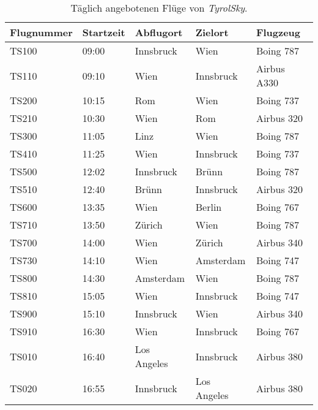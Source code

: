 \begin{table}
  \centering
  \begin{tabular}{lllll}
  Flugnummer & Startzeit & Abflugort     & Zielort    & Flugzeug    \\ \hline  %
    TS100  & 09:00   & Innsbruck     & Wien     & Boing 787   \\      %
    TS110  & 09:10   & Wien       & Innsbruck   & Airbus A330  \\      %
    TS200  & 10:15   & Rom        & Wien     & Boing 737   \\      %
    TS210  & 10:30   & Wien     	& Rom      & Airbus 320   \\      %
    TS300  & 11:05   & Linz       & Wien     & Boing 787   \\      %
    TS410  & 11:25   & Wien       & Innsbruck   & Boing 737   \\      %
    TS500  & 12:02   & Innsbruck     & Brünn     & Boing 787   \\      %
    TS510  & 12:40   & Brünn       & Innsbruck   & Airbus 320   \\      %
    TS600  & 13:35   & Wien       & Berlin    & Boing 767   \\      %
    TS710  & 13:50   & Zürich      & Wien     & Boing 787   \\      %
    TS700  & 14:00   & Wien       & Zürich    & Airbus 340   \\      %
    TS730  & 14:10   & Wien       & Amsterdam   & Boing 747   \\      %
    TS800  & 14:30   & Amsterdam     & Wien     & Boing 787   \\      %
    TS810  & 15:05   & Wien       & Innsbruck   & Boing 747   \\      %
    TS900  & 15:10   & Innsbruck     & Wien     & Airbus 340   \\      %
    TS910  & 16:30   & Wien       & Innsbruck   & Boing 767   \\      %
    TS010  & 16:40   & Los Angeles    & Innsbruck   & Airbus 380   \\      %
    TS020  & 16:55   & Innsbruck     & Los Angeles  & Airbus 380   \\     %
  \end{tabular}
  \caption{Täglich angebotenen Flüge von \textit{TyrolSky}.}
  \label{tab:TyrolSky:destinations}
\end{table} 


